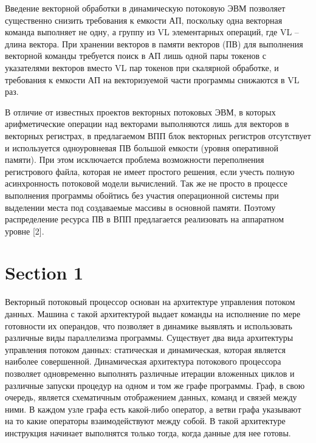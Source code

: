 \documentclass[
11pt,%
tightenlines,%
twoside,%
onecolumn,%
nofloats,%
nobibnotes,%
nofootinbib,%
superscriptaddress,%
noshowpacs,%
centertags]%
{revtex4}
\begin{document}
Введение векторной обработки в динамическую потоковую ЭВМ позволяет существенно снизить требования к емкости АП, поскольку одна векторная команда выполняет не одну, а группу из VL элементарных операций, где VL – длина вектора. При хранении векторов в памяти векторов (ПВ) для выполнения векторной команды требуется поиск в АП лишь одной пары токенов с указателями векторов вместо VL пар токенов при скалярной обработке, и требования к емкости АП на векторизуемой части программы снижаются в VL раз.

В отличие от известных проектов векторных потоковых ЭВМ, в которых арифметические операции над векторами выполняются лишь для векторов в векторных регистрах, в предлагаемом ВПП блок векторных регистров отсутствует и используется одноуровневая ПВ большой емкости (уровня оперативной памяти). При этом исключается проблема возможности переполнения регистрового файла, которая не имеет простого решения, если учесть полную асинхронность потоковой модели вычислений. Так же не просто в процессе выполнения программы обойтись без участия операционной системы при выделении места под создаваемые массивы в основной памяти. Поэтому распределение ресурса ПВ в ВПП предлагается реализовать на аппаратном уровне [2].


\section{Section 1}

Векторный потоковый процессор основан на архитектуре управления потоком данных. Машина с такой архитектурой выдает команды на исполнение по мере готовности их операндов, что позволяет в динамике выявлять и использовать различные виды параллелизма программы. Существует два вида архитектуры управления потоком данных: статическая и динамическая, которая является наиболее совершенной. Динамическая архитектура потокового процессора позволяет одновременно выполнять различные итерации вложенных циклов и различные запуски процедур на одном и том же графе программы. Граф, в свою очередь, является схематичным отображением данных, команд и связей между ними. В каждом узле графа есть какой-либо оператор, а ветви графа указывают на то какие операторы взаимодействуют между собой. В такой архитектуре инструкция начинает выполнятся только тогда, когда данные для нее готовы.
\end{document}
